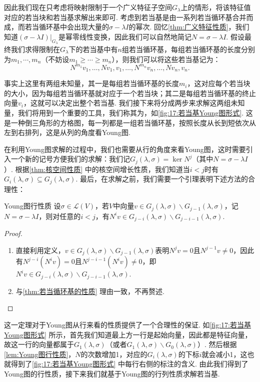 因此我们现在只考虑将映射限制于一个广义特征子空间$G_\lambda$上的情形，将该特征值对应的若当块和若当基求解出来即可. 考虑到若当基是由一系列若当循环基合并而成，而若当循环基中会出现大量的$\sigma-\lambda I$的幂次. 回忆\autoref{thm:广义特征性质}，我们知道$(\sigma-\lambda I)\vert_{G_\lambda}$是幂零线性变换，因此我们可以自然地简记$N=\sigma-\lambda I$. 假设最终我们求得限制在$G_\lambda$下的若当基中有$n$组若当循环基，每组若当循环基的长度分别为$m_1,\cdots,m_n$（不妨设$m_1\geqslant\cdots\geqslant m_n$），则我们可以将这些若当基记为：
\[N^{m_1}v_1,\ldots,Nv_1,v_1,\ldots,N^{m_n}v_n,\ldots,Nv_n,v_n.\]

事实上这里有两组未知量，其一是每组若当循环基的长度$m_i$，这对应每个若当块的大小，因为每组若当循环基就对应于一个若当块；其二是每组若当循环基的终止向量$v_i$，这就可以决定出整个若当基. 我们接下来将分成两步来求解这两组未知量，我们将用到一个重要的工具，我们称其为，如\autoref{fig:17:若当基Young图形式}. 这是一种倒三角形的方格图，每一列都是一组若当循环基，按照长度从长到短依次从左到右排列，这是从列的角度看Young图.

在利用Young图求解的过程中，我们也需要从行的角度来看Young图，这时需要引入一个新的记号方便我们的求解：我们记$G_j(\lambda,\sigma)=\ker N^j$（其中$N=\sigma-\lambda I$）. 根据\autoref{thm:核空间性质} 中的核空间增长性质，我们知道当$i<j$时有$G_i(\lambda,\sigma)\subseteq G_j(\lambda,\sigma)$. 最后，在求解之前，我们需要一个引理表明下述方法的合理性：
\begin{lemma}{}{Young图行性质}
    设$\sigma\in \mathcal{L}(V)$，若$V$中向量$v\in G_j(\lambda,\sigma)\backslash G_{j-1}(\lambda,\sigma)$，记$N=\sigma-\lambda I$，则对任意的$i<j$，有$N^iv\in G_{j-i}(\lambda,\sigma)\backslash G_{j-i-1}(\lambda,\sigma)$.
\end{lemma}

\begin{proof}
    \begin{enumerate}
        \item 直接利用定义，$v\in G_j(\lambda,\sigma)\backslash G_{j-1}(\lambda,\sigma)$表明$N^jv=0$且$N^{j-1}v\neq 0$，因此有$N^{j-i}(N^iv)=0$且$N^{j-i-1}(N^iv)\neq 0$，即$N^iv\in G_{j-i}(\lambda,\sigma)\backslash G_{j-i-1}(\lambda,\sigma)$.

        \item 与\autoref{thm:若当循环基的性质} 理由一致，不再赘述.
    \end{enumerate}
\end{proof}

这一定理对于Young图从行来看的性质提供了一个合理性的保证. 如\autoref{fig:17:若当基Young图形式} 所示，首先我们知道最上方一行是起始向量，因此都是特征向量，故这一行的向量都属于$G_1(\lambda,\sigma)$（或者$G_1(\lambda,\sigma)\backslash G_0(\lambda,\sigma)$）. 然后根据\autoref{lem:Young图行性质}，$N$的次数增加1，对应的$G_i(\lambda,\sigma)$的下标$i$就会减小1，这也就得到了\autoref{fig:17:若当基Young图形式} 中每行右侧的标注的含义. 由此我们得到了Young图的行性质，接下来我们就基于Young图的行列性质求解若当基.

